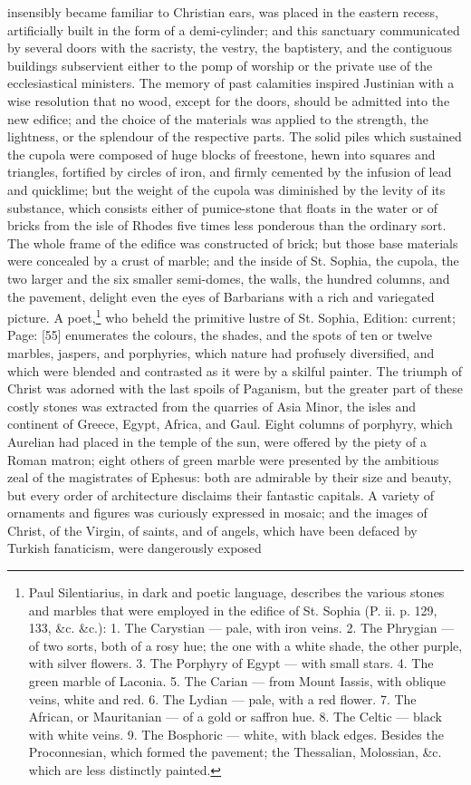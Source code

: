 insensibly became familiar to Christian ears, was placed in the eastern recess, artificially built in the form of a demi-cylinder; and this sanctuary communicated by several doors with the sacristy, the vestry, the baptistery, and the contiguous buildings subservient either to the pomp of worship or the private use of the ecclesiastical ministers. The memory of past calamities inspired Justinian with a wise resolution that no wood, except for the doors, should be admitted into the new edifice; and the choice of the materials was applied to the strength, the lightness, or the splendour of the respective parts. The solid piles which sustained the cupola were composed of huge blocks of freestone, hewn into squares and triangles, fortified by circles of iron, and firmly cemented by the infusion of lead and quicklime; but the weight of the cupola was diminished by the levity of its substance, which consists either of pumice-stone that floats in the water or of bricks from the isle of Rhodes five times less ponderous than the ordinary sort. The whole frame of the edifice was constructed of brick; but those base materials were concealed by a crust of marble; and the inside of St. Sophia, the cupola, the two larger and the six smaller semi-domes, the walls, the hundred columns, and the pavement, delight even the eyes of Barbarians with a rich and variegated picture. A poet,\footnote{Paul Silentiarius, in dark and poetic language, describes the various stones and marbles that were employed in the edifice of St. Sophia (P. ii. p. 129, 133, \&c. \&c.): 1. The Carystian \texthebrew{—} pale, with iron veins. 2. The Phrygian \texthebrew{—} of two sorts, both of a rosy hue; the one with a white shade, the other purple, with silver flowers. 3. The Porphyry of Egypt \texthebrew{—} with small stars. 4. The green marble of Laconia. 5. The Carian \texthebrew{—} from Mount Iassis, with oblique veins, white and red. 6. The Lydian \texthebrew{—} pale, with a red flower. 7. The African, or Mauritanian \texthebrew{—} of a gold or saffron hue. 8. The Celtic \texthebrew{—} black with white veins. 9. The Bosphoric \texthebrew{—} white, with black edges. Besides the Proconnesian, which formed the pavement; the Thessalian, Molossian, \&c. which are less distinctly painted.} who beheld the primitive lustre of St. Sophia, Edition: current; Page: [55] enumerates the colours, the shades, and the spots of ten or twelve marbles, jaspers, and porphyries, which nature had profusely diversified, and which were blended and contrasted as it were by a skilful painter. The triumph of Christ was adorned with the last spoils of Paganism, but the greater part of these costly stones was extracted from the quarries of Asia Minor, the isles and continent of Greece, Egypt, Africa, and Gaul. Eight columns of porphyry, which Aurelian had placed in the temple of the sun, were offered by the piety of a Roman matron; eight others of green marble were presented by the ambitious zeal of the magistrates of Ephesus: both are admirable by their size and beauty, but every order of architecture disclaims their fantastic capitals. A variety of ornaments and figures was curiously expressed in mosaic; and the images of Christ, of the Virgin, of saints, and of angels, which have been defaced by Turkish fanaticism, were dangerously exposed 
